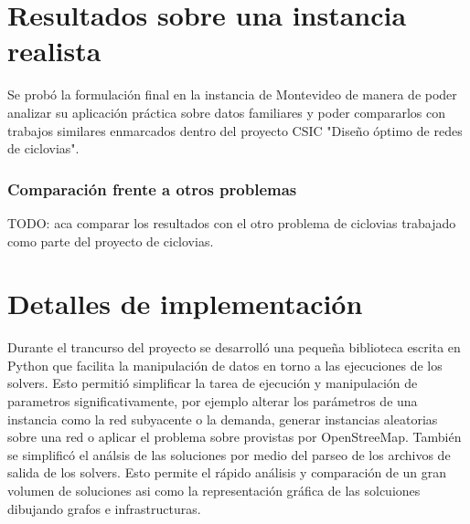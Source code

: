 \documentclass{article}
\begin{document}

  \section*{Resultados sobre una instancia realista}

  Se probó la formulación final en la instancia de Montevideo de manera de poder analizar su aplicación práctica sobre datos familiares y poder compararlos con trabajos similares enmarcados dentro del proyecto CSIC "Diseño óptimo de redes de ciclovias".


  \subsubsection*{Comparación frente a otros problemas}

  TODO: aca comparar los resultados con el otro problema de ciclovias trabajado como parte del proyecto de ciclovias.

  \section*{Detalles de implementación}

  Durante el trancurso del proyecto se desarrolló una pequeña biblioteca escrita en Python que facilita la manipulación de datos en torno a las ejecuciones de los solvers. Esto permitió simplificar la tarea de ejecución y manipulación de parametros significativamente, por ejemplo alterar los parámetros de una instancia como la red subyacente o la demanda, generar instancias aleatorias sobre una red o aplicar el problema sobre provistas por OpenStreeMap. También se simplificó el análsis de las soluciones por medio del parseo de los archivos de salida de los solvers. Esto permite el rápido análisis y comparación de un gran volumen de soluciones asi como la representación gráfica de las solcuiones dibujando grafos e infrastructuras.
\end{document}
